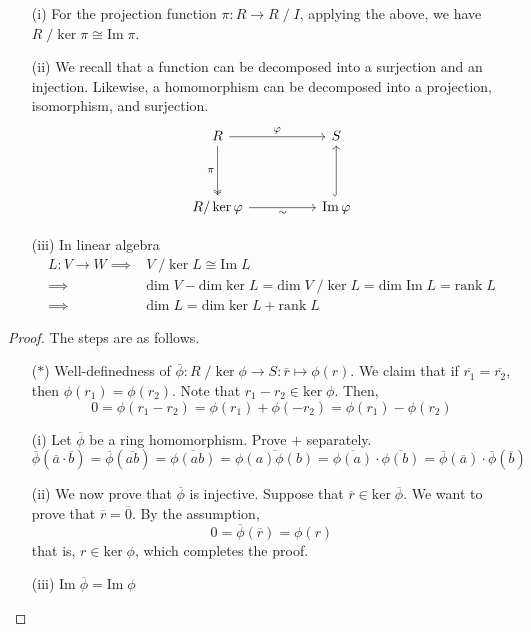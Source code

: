 \begin{rmk}
\begin{itemize}
\item[(i)] For the projection function $\pi :R\rightarrow R\;/\;I$, applying the above, we have $R\;/\;\mathrm{ker}\;\pi \cong \mathrm{Im}\;\pi $.
\item[(ii)] We recall that a function can be decomposed into a surjection and an injection. Likewise, a homomorphism can be decomposed into a projection, isomorphism, and surjection.
\[
\begin{tikzcd}[row sep=huge, column sep=huge, ampersand replacement=\&]
\huge R \arrow[r, "\huge \varphi"] \arrow[d, two heads, "\huge \pi"'] \& \huge S \\
\huge R/\ker\varphi \arrow[r, "\huge \sim"'] \& \huge \mathrm{Im}\,\varphi \arrow[u, hook]
\end{tikzcd}
\]
\item[(iii)] In linear algebra
\begin{align*}
L:V\rightarrow W\implies & V\;/\;\mathrm{ker}\;L \cong \mathrm{Im}\;L\\
\implies& \mathrm{dim}\;V-\mathrm{dim}\;\mathrm{ker}\;L=\mathrm{dim}\;V\;/\;\mathrm{ker}\;L=\mathrm{dim}\;\mathrm{Im}\;L=\mathrm{rank}\;L\\
\implies & \mathrm{dim}\;L=\mathrm{dim}\;\mathrm{ker}\;L+\mathrm{rank}\;L
\end{align*}
\end{itemize}
\end{rmk}
\vspace{2ex}
\begin{proof}
The steps are as follows.
\begin{itemize}
\item[($\ast$)] Well-definedness of $\overline{\phi }:R\;/\;\mathrm{ker}\;\phi \rightarrow S:\overline{r}\mapsto \phi (r)$. We claim that if $\overline{r_1}=\overline{r_2}$, then $\phi (r_1)=\phi (r_2)$. Note that $r_1-r_2\in \mathrm{ker}\;\phi $. Then,
\[0=\phi (r_1-r_2)=\phi (r_1)+\phi (-r_2)=\phi (r_1)-\phi (r_2)\]
\item[(i)] Let $\overline{\phi }$ be a ring homomorphism. Prove $+$ separately.
\[\overline{\phi }(\overline{a}\cdot \overline{b})=\overline{\phi }(\overline{ab})=\overline{\phi (ab)}=\overline{\phi (a)\phi (b)}=\overline{\phi (a)}\cdot \overline{\phi (b)}=\overline{\phi }(\overline{a})\cdot \overline{\phi }(\overline{b})\]
\item[(ii)] We now prove that $\overline{\phi }$ is injective. Suppose that $\overline{r}\in \mathrm{ker}\;\overline{\phi }$. We want to prove that $\overline{r}=\overline{0}$. By the assumption,
\[0=\overline{\phi }(\overline{r})=\phi (r)\]
that is, $r\in \mathrm{ker}\;\phi $, which completes the proof.
\item[(iii)] $\mathrm{Im}\;\overline{\phi }=\mathrm{Im}\;\phi $ 
\end{itemize}
\end{proof}
